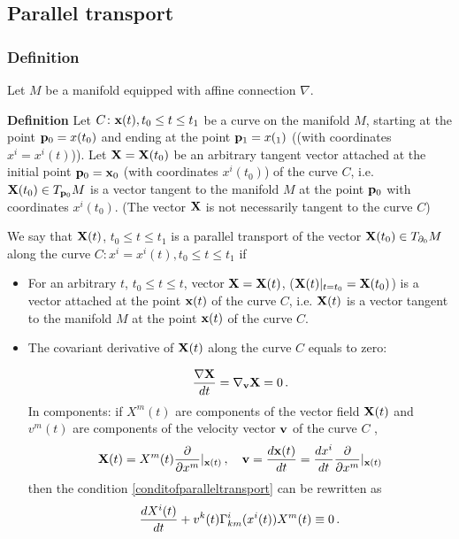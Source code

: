 \documentclass[12pt]{article}
\theoremstyle{theorem}
\numberwithin{equation}{section}
\begin{document}
{   \subsection{Parallel transport}\label{paralleltransport}


\subsubsection {Definition}

   Let $M$ be a manifold equipped with affine connection $\nabla$.

   {\bf Definition} Let $C\colon {\bf x}(t), t_0\leq t\leq t_1$ 
     be a curve on the manifold $M$,
   starting at the point ${\bf p}_0=x(t_0)$ and ending at the point
    ${\bf p}_1=x(_1)$ ((with coordinates $x^i=x^i(t)$)).
   Let ${\bf X}={\bf X}(t_0)$ be an arbitrary tangent  vector 
attached at the initial point ${\bf p}_0={\bf x}_0$ 
(with coordinates $x^i(t_0)$) of the curve $C$, i.e.
  ${\bf X}(t_0)\in T_{{\bf p}_0}M$ is a vector tangent to the manifold $M$
  at the point ${\bf p}_0$ with coordinates $x^i(t_0)$.
  (The vector ${\bf X}$ is not necessarily tangent to the curve $C$)

  We say that ${\bf X}(t)$, $t_0\leq t\leq t_1$ is a parallel transport of the
  vector ${\bf X}(t_0)\in T_{\partial_0}M$ along the curve $C\colon x^i=x^i(t), t_0\leq t\leq t_1$ if

\begin {itemize}

\item For an arbitrary $t$, $t_0\leq t\leq t$, vector ${\bf X}={\bf X}(t)$, (${\bf X}(t)\vert_{t=t_0}={\bf X}(t_0)$)
 is a vector attached at the point
  ${\bf x}(t)$ of the curve $C$,
 i.e. ${\bf X}(t)$ is a vector tangent to the manifold $M$
  at the point ${\bf x}(t)$  of the curve $C$.

  \item The covariant derivative of ${\bf X}(t)$ along the curve $C$ equals to zero:

  \begin{equation}\label{conditofparalleltransport}
    {\nabla {\bf X}\over dt}=\nabla_{\bf v} {\bf X}=0\,.
  \end{equation}
 In components: if $X^m(t)$ are components of the vector field ${\bf X}(t)$
 and   $v^m(t)$ are components of the velocity vector ${\bf v}$ of the curve  $C$ ,
                $$
                {\bf X}(t)=X^m(t){\partial \over \partial x^m}\vert_{{\bf x}(t)}\,,\quad
                {\bf v}={d{\bf x}(t)\over dt}={dx^i\over dt}{\partial \over \partial x^m}\vert_{{\bf x}(t)}
                $$
  then the condition \eqref{conditofparalleltransport} can be rewritten as
  \begin{equation}\label{conditofparalleltransportcomponents}
    {dX^i(t)\over dt}+v^k(t)\Gamma^i_{km}(x^i(t))X^m(t)\equiv 0\,.
  \end{equation}



\end{itemize}}
\end{document}
